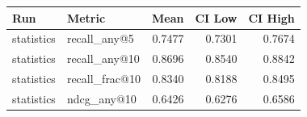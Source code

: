 \begin{tabular}{llrrr}
\toprule
Run & Metric & Mean & CI Low & CI High \\
\midrule
statistics & recall\_any@5 & 0.7477 & 0.7301 & 0.7674 \\
statistics & recall\_any@10 & 0.8696 & 0.8540 & 0.8842 \\
statistics & recall\_frac@10 & 0.8340 & 0.8188 & 0.8495 \\
statistics & ndcg\_any@10 & 0.6426 & 0.6276 & 0.6586 \\
\bottomrule
\end{tabular}
